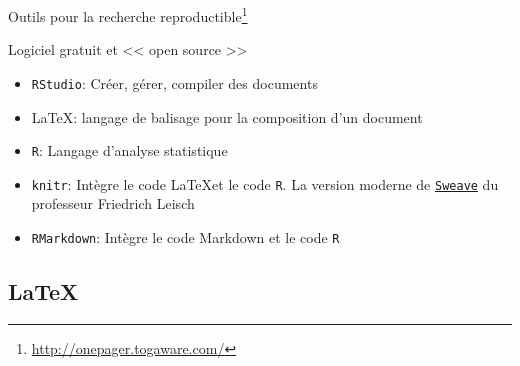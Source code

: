 \documentclass[10pt]{beamer}\usepackage[]{graphicx}\usepackage[]{color}
\begin{document}
\begin{frame}{Outils pour la recherche reproductible\footnote{\href{http://onepager.togaware.com/}{http://onepager.togaware.com/}}}


\begin{block}{Logiciel gratuit et << open source >>}
\begin{itemize}
\item \texttt{RStudio}: Créer, gérer, compiler des documents
\item \LaTeX: langage de balisage pour la composition d'un document
\item \texttt{R}: Langage d'analyse statistique
\item \texttt{knitr}: Intègre le code \LaTeX et le code \texttt{R}. La version moderne de \href{https://www.statistik.lmu.de/~leisch/Sweave/}{\texttt {Sweave}} du professeur Friedrich Leisch
\item \texttt{RMarkdown}: Intègre le code Markdown et le code \texttt{R}
\end{itemize}
\end{block}
\end{frame}


\subsection{\LaTeX}
\end{document}
